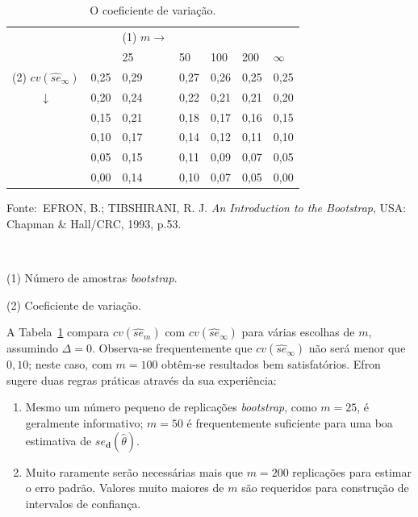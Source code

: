 \begin{table}[!htbp]
\centering
\begin{threeparttable}
\caption{O coeficiente de variação.}
\begin{tabular}{lllllll}
\hline
 &  & (1) $m \to$ &  &  &  &  \\ 
 &  & 25 & 50 & 100 & 200 & $\infty$ \\ 
\hline
(2) $cv(\widehat{se}_{\infty})$ & 0,25 & 0,29 & 0,27 & 0,26 & 0,25 & 0,25 \\ 
\multicolumn{1}{c}{$\downarrow$} & 0,20 & 0,24 & 0,22 & 0,21 & 0,21 & 0,20 \\ 
 & 0,15 & 0,21 & 0,18 & 0,17 & 0,16 & 0,15 \\ 
 & 0,10 & 0,17 & 0,14 & 0,12 & 0,11 & 0,10 \\ 
 & 0,05 & 0,15 & 0,11 & 0,09 & 0,07 & 0,05 \\ 
 & 0,00 & 0,14 & 0,10 & 0,07 & 0,05 & 0,00 \\ 
\hline
\end{tabular}
\begin{tablenotes}[flushleft] %
    \footnotesize
    \item Fonte:~EFRON, B.; TIBSHIRANI, R. J. \textit{An Introduction to the Bootstrap}, USA: Chapman \& Hall/CRC, 1993, p.53.
	\item ~
	\item (1) Número de amostras \textit{bootstrap}.
	\item (2) Coeficiente de variação.
\end{tablenotes}
\label{tab:coefvaria}
\end{threeparttable}
\end{table}

A Tabela~\ref{tab:coefvaria} compara $cv(\widehat{se}_m)$ com $cv(\widehat{se}_{\infty})$ para várias escolhas de $m$, assumindo $\Delta = 0$. Observa-se frequentemente que $cv(\widehat{se}_{\infty})$ não será menor que $0,10$; neste caso, com $m = 100$ obtêm-se resultados bem satisfatórios. Efron~\cite{EFRON:1993} sugere duas regras práticas através da sua experiência:

\begin{enumerate}[label=\alph*)]
    \item Mesmo um número pequeno de replicações \textit{bootstrap}, como $m = 25$, é geralmente informativo; $m = 50$ é frequentemente suficiente para uma boa estimativa de $se_{\mathbf{d}}(\widehat{\theta})$.
    \item Muito raramente serão necessárias mais que $m = 200$ replicações para estimar o erro padrão. Valores muito maiores de $m$ são requeridos para construção de intervalos de confiança.
\end{enumerate}

